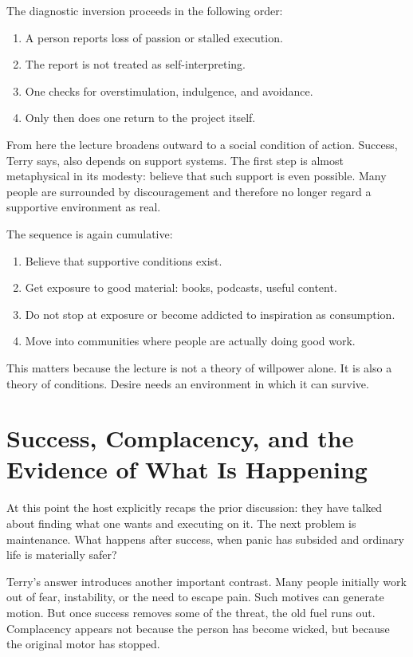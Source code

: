 The diagnostic inversion proceeds in the following order:
\begin{enumerate}
\item A person reports loss of passion or stalled execution.
\item The report is not treated as self-interpreting.
\item One checks for overstimulation, indulgence, and avoidance.
\item Only then does one return to the project itself.
\end{enumerate}

From here the lecture broadens outward to a social condition of action. Success, Terry says, also depends on support systems. The first step is almost metaphysical in its modesty: believe that such support is even possible. Many people are surrounded by discouragement and therefore no longer regard a supportive environment as real.

The sequence is again cumulative:
\begin{enumerate}
\item Believe that supportive conditions exist.
\item Get exposure to good material: books, podcasts, useful content.
\item Do not stop at exposure or become addicted to inspiration as consumption.
\item Move into communities where people are actually doing good work.
\end{enumerate}
This matters because the lecture is not a theory of willpower alone. It is also a theory of conditions. Desire needs an environment in which it can survive.

\section{Success, Complacency, and the Evidence of What Is Happening}

At this point the host explicitly recaps the prior discussion: they have talked about finding what one wants and executing on it. The next problem is maintenance. What happens after success, when panic has subsided and ordinary life is materially safer?

Terry's answer introduces another important contrast. Many people initially work out of fear, instability, or the need to escape pain. Such motives can generate motion. But once success removes some of the threat, the old fuel runs out. Complacency appears not because the person has become wicked, but because the original motor has stopped.

